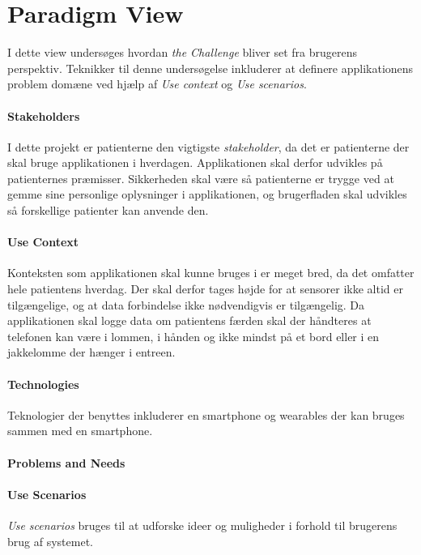 

\section{Paradigm View}
I dette view undersøges hvordan \textit{the Challenge} bliver set fra brugerens perspektiv.
Teknikker til denne undersøgelse inkluderer at definere applikationens problem domæne ved hjælp af \textit{Use context} og \textit{Use scenarios}.

\paragraph{Stakeholders}
I dette projekt er patienterne den vigtigste \textit{stakeholder}, da det er patienterne der skal bruge applikationen i hverdagen.
Applikationen skal derfor udvikles på patienternes præmisser.
Sikkerheden skal være så patienterne er trygge ved at gemme sine personlige oplysninger i applikationen, og brugerfladen skal udvikles så forskellige patienter kan anvende den.

\paragraph{Use Context}
Konteksten som applikationen skal kunne bruges i er meget bred, da det omfatter hele patientens hverdag.
Der skal derfor tages højde for at sensorer ikke altid er tilgængelige, og at data forbindelse ikke nødvendigvis er tilgængelig.
Da applikationen skal logge data om patientens færden skal der håndteres at telefonen kan være i lommen, i hånden og ikke mindst på et bord eller i en jakkelomme der hænger i entreen.

\paragraph{Technologies}
Teknologier der benyttes inkluderer en smartphone og wearables der kan bruges sammen med en smartphone.

\paragraph{Problems and Needs}

\paragraph{Use Scenarios}
\textit{Use scenarios} bruges til at udforske ideer og muligheder i forhold til brugerens brug af systemet.

